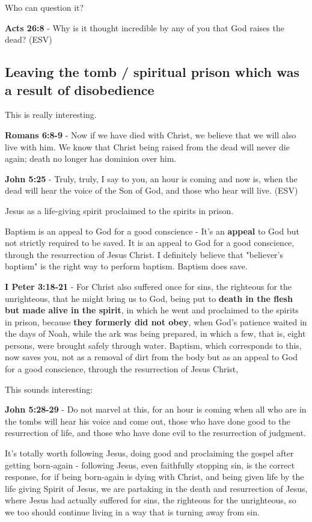 \documentclass[11pt]{article}
\begin{document}
Who can question it?

\textbf{Acts 26:8} -  Why is it thought incredible by any of you that God raises the dead?  (ESV)

\subsection{Leaving the tomb / spiritual prison which was a result of disobedience}
\label{sec:org04bfb38}
This is really interesting.

\textbf{Romans 6:8-9} - Now if we have died with Christ, we believe that we will also live with him. We know that Christ being raised from the dead will never die again; death no longer has dominion over him.

\textbf{John 5:25} - Truly, truly, I say to you, an hour is coming and now is, when the dead will hear the voice of the Son of God, and those who hear will live. (ESV)

Jesus as a life-giving spirit proclaimed to the spirits in prison.

Baptism is an appeal to God for a good conscience - It's an \textbf{appeal} to God but not strictly required to be saved.
It is an appeal to God for a good conscience, through the resurrection of Jesus Christ.
I definitely believe that "believer's baptism" is the right way to perform baptism.
Baptism does save.

\textbf{I Peter 3:18-21} - For Christ also suffered once for sins, the righteous for the unrighteous, that he might bring us to God, being put to \textbf{death in the flesh but made alive in the spirit}, in which he went and proclaimed to the spirits in prison, because \textbf{they formerly did not obey}, when God's patience waited in the days of Noah, while the ark was being prepared, in which a few, that is, eight persons, were brought safely through water. Baptism, which corresponds to this, now saves you, not as a removal of dirt from the body but as an appeal to God for a good conscience, through the resurrection of Jesus Christ,

This sounds interesting:

\textbf{John 5:28-29} - Do not marvel at this, for an hour is coming when all who are in the tombs will hear his voice and come out, those who have done good to the resurrection of life, and those who have done evil to the resurrection of judgment.

It's totally worth following Jesus, doing good and proclaiming the gospel after getting born-again - following Jesus, even faithfully stopping sin, is the correct response,
for if being born-again is dying with Christ, and being given life by the life giving Spirit of Jesus,
we are partaking in the death and resurrection of Jesus, where Jesus had actually suffered for sins, the righteous for the unrighteous, so we too should continue living in a way that is turning away from sin.
\end{document}
